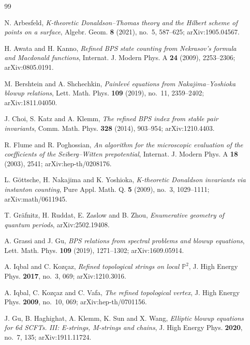 \documentclass{amsart}
\theoremstyle{definition}
\numberwithin{equation}{section}
\begin{document}
\begin{thebibliography}{99}

 N. Arbesfeld, \emph{K-theoretic Donaldson--Thomas theory and the Hilbert scheme of points on a surface}, Algebr. Geom. \textbf{8} (2021), no.~5, 587--625; arXiv:1905.04567.

 H. Awata and H. Kanno, \emph{Refined BPS state counting from Nekrasov's formula and Macdonald functions}, Internat. J. Modern Phys. A \textbf{24} (2009), 2253--2306; arXiv:0805.0191.

 M. Bershtein and A. Shchechkin, \emph{Painlev\'e equations from Nakajima--Yoshioka blowup relations}, Lett. Math. Phys. \textbf{109} (2019), no.~11, 2359--2402; arXiv:1811.04050.

 J. Choi, S. Katz and A. Klemm, \emph{The refined BPS index from stable pair invariants}, Comm. Math. Phys. \textbf{328} (2014), 903--954; arXiv:1210.4403.

 R. Flume and R. Poghossian, \emph{An algorithm for the microscopic evaluation of the coefficients of the Seiberg--Witten prepotential}, Internat. J. Modern Phys. A \textbf{18} (2003), 2541; arXiv:hep-th/0208176.

 L. G\"ottsche, H. Nakajima and K. Yoshioka, \emph{K-theoretic Donaldson invariants via instanton counting}, Pure Appl. Math. Q. \textbf{5} (2009), no.~3, 1029--1111; arXiv:math/0611945.

 T. Gr\"afnitz, H. Ruddat, E. Zaslow and B. Zhou, \emph{Enumerative geometry of quantum periods}, arXiv:2502.19408.

 A. Grassi and J. Gu, \emph{BPS relations from spectral problems and blowup equations}, Lett. Math. Phys. \textbf{109} (2019), 1271--1302; arXiv:1609.05914.

 A. Iqbal and C. Koz\c{c}az, \emph{Refined topological strings on local \(\mathbb P^2\)}, J. High Energy Phys. \textbf{2017}, no.~3, 069; arXiv:1210.3016.

 A. Iqbal, C. Koz\c{c}az and C. Vafa, \emph{The refined topological vertex}, J. High Energy Phys. \textbf{2009}, no.~10, 069; arXiv:hep-th/0701156.

 J. Gu, B. Haghighat, A. Klemm, K. Sun and X. Wang, \emph{Elliptic blowup equations for 6d SCFTs. III: E-strings, M-strings and chains}, J. High Energy Phys. \textbf{2020}, no.~7, 135; arXiv:1911.11724.


\end{thebibliography}
\end{document}
